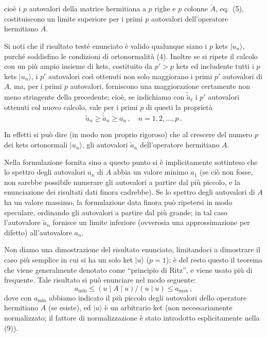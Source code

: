 \documentclass[11pt, a4paper]{book}
\numberwithin{equation}{section}
\begin{document}

cioè i $p$ autovalori della matrice hermitiana a $p$ righe e $p$ colonne $\tilde{A}$,
eq.\ (5), costituiscono un limite superiore per i primi $p$ autovalori dell'operatore hermitiano $A$.

Si noti che il risultato testé enunciato è valido qualunque siano
i $p$ kets $|u_n\rangle$, purché soddisfino le condizioni di ortonormalità (4).
Inoltre se si ripete il calcolo con un più ampio insieme di kets,
costituito da $p' > p$ kets ed includente tutti i $p$ kets $|u_n\rangle$, i $p'$ autovalori così ottenuti non solo maggiorano i primi $p'$ autovalori di $A$, ma,
per i primi $p$ autovalori, forniscono una maggiorazione certamente non
meno stringente della precedente; cioè, se indichiamo con $\tilde{\tilde{a}}_\ell$ i $p'$
autovalori ottenuti col nuovo calcolo, vale per i primi $p$ di questi la
proprietà
\begin{equation}
\tilde{a}_n \geq \tilde{\tilde{a}}_n \geq a_n \,, \quad n = 1, 2, \ldots, p \,. \tag{8}
\end{equation}

In effetti si può dire (in modo non proprio rigoroso) che al crescere del numero $p$ dei kets ortonormali $|u_n\rangle$, gli autovalori $\tilde{a}_n$ dell'operatore hermitiano $A$.

Nella formulazione fornita sino a questo punto si è implicitamente
sottinteso che lo spettro degli autovalori $a_n$ di $A$ abbia un valore minimo $a_1$ (se ciò non fosse, non sarebbe possibile numerare gli autovalori
a partire dal più piccolo, e la enunciazione dei risultati dati finora cadrebbe).
Se lo spettro degli autovalori di $A$ ha un valore massimo, la formulazione
data finora può ripetersi in modo speculare, ordinando gli autovalori a partire dal più grande; in tal caso l'autovalore $\tilde{a}_n$ fornisce un limite inferiore (ovverosia una approssimazione per difetto) all'autovalore $a_n$.

Non diamo una dimostrazione del risultato enunciato, limitandoci a
dimostrare il caso più semplice in cui si ha un solo ket $|u\rangle$ ($p = 1$); è
del resto questo il teorema che viene generalmente denotato come ``principio di Ritz'', e viene usato più di frequente. Tale risultato si può enunciare nel modo seguente:
\begin{equation}
a_{\min} \leq (u \mid A \mid u) / (u \mid u) \leq a_{\max} \,, \tag{9}
\end{equation}
dove con $a_{\min}$ abbiamo indicato il più piccolo degli autovalori dello
operatore hermitiano $A$ (se esiste), ed $|u\rangle$ è un arbitrario ket (non necessariamente normalizzato; il fattore di normalizzazione
è stato introdotto esplicitamente nella (9)).
\end{document}
